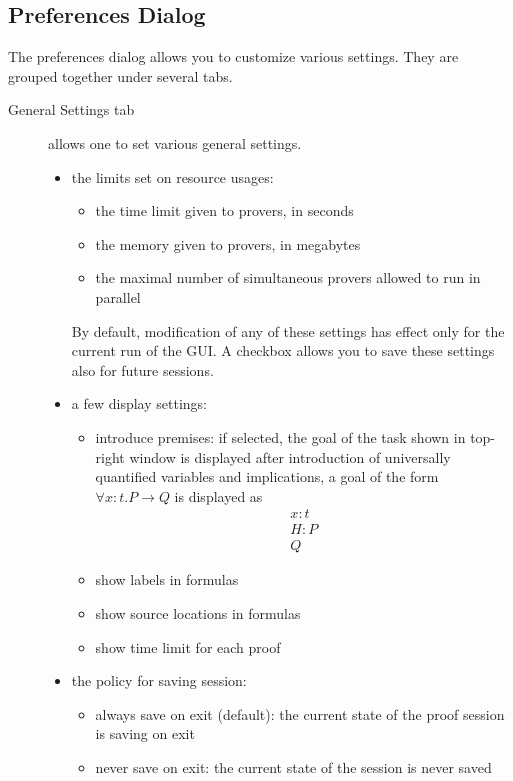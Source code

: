 \subsection{Preferences Dialog}

The preferences dialog allows you to customize various settings. They
are grouped together under several tabs.

\begin{description}
\item[\textsf{General Settings} tab] allows one to set
  various general settings.
\begin{itemize}
\item the limits set on resource usages:
  \begin{itemize}
  \item the time limit given to provers, in seconds
  \item the memory given to provers, in megabytes
  \item the maximal number of simultaneous provers allowed to run in parallel
  \end{itemize}
  By default, modification of any of these settings has effect only
  for the current run of the GUI. A checkbox allows you to save these
  settings also for future sessions.
\item a few display settings:
  \begin{itemize}
  \item introduce premises: if selected, the goal of the task shown in
    top-right window is displayed after introduction of universally
    quantified variables and implications, \eg a goal of the form
    $\forall x: t. P \rightarrow Q$ is displayed as
    \[
    \begin{array}{l}
      x : t \\
      H : P \\
      \hline
      Q
    \end{array}
    \]
  \item show labels in formulas
  \item show source locations in formulas
  \item show time limit for each proof
  \end{itemize}
\item the policy for saving session:
  \begin{itemize}
  \item always save on exit (default): the current state of the proof session is saving on exit
  \item never save on exit: the current state of the session is never saved

\end{itemize}
\end{itemize}
\end{description}
